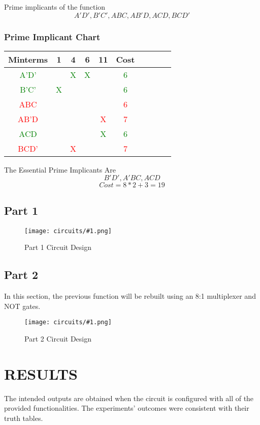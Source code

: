 \documentclass[pdftex,12pt,a4paper]{article}
\newcommand{\circuit}[1]{
\begin{figure}[H]
\texttt{[image: circuits/\#1.png]}
\caption{Part #1 Circuit Design}
\end{figure}
}
\newcommand{\qg}[1]{\textcolor{green}{#1}}
\newcommand{\qr}[1]{\textcolor{red}{#1}}
\begin{document}
\begin{center}
\hspace{20pt}Prime implicants of the function\[A'D', B'C', ABC, AB'D, ACD, BCD'\]
\end{center}

\subsubsection{Prime Implicant Chart}
    \begin{center}
        \begin{tabular}{c | c c c c c c c c | c}
            Minterms & 1 & 4 & 6 & 11 & Cost\\
            \hline 
            \qg{A'D'}   &&\qg{X}&\qg{X}&&\qg{6} \\
            \qg{B'C'}   &\qg{X}&&&&\qg{6} \\
            \qr{ABC}    &&&&&\qr{6} \\
            \qr{AB'D}   &&&&\qr{X}&\qr{7} \\
            \qg{ACD}    &&&&\qg{X}&\qg{6} \\
            \qr{BCD'}    &&\qr{X}&&&\qr{7} \\
        \end{tabular}
    \end{center}
    \begin{center}
        \hspace{20pt}The Essential Prime Implicants Are\[B'D', A'BC, ACD\]
        \[Cost = 8 * 2 + 3 = 19\]
    \end{center}
    
\subsection{Part 1}
\circuit{1}

\newpage

\subsection{Part 2}
In this section, the previous function will be rebuilt using an 8:1 multiplexer and NOT gates.
\par\vspace{0.8cm}
\circuit{2}

\par\vspace{0.5cm}

\section{RESULTS}
The intended outputs are obtained when the circuit is configured with all of the provided functionalities. The experiments' outcomes were consistent with their truth tables.
\end{document}
